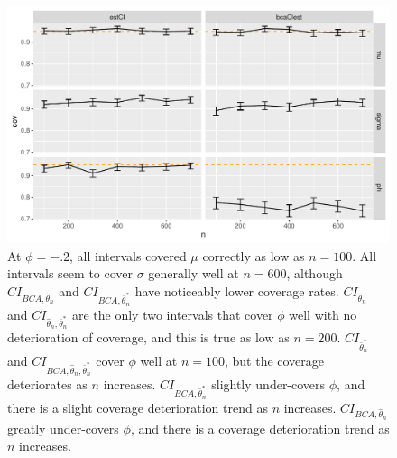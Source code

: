 \documentclass[12pt, letterpaper, titlepage]{article}
\begin{document}
\begin{figure}[tbp]
\caption{}
  \centering
  \includegraphics[width=\textwidth]{figures/plot_n.2}
  \caption{At $\phi = -.2$, all intervals covered $\mu$ correctly as low as $n = 100$. All intervals seem to cover $\sigma$ generally well at $n = 600$, although $CI_{BCA, \hat{\theta}_{n}}$ and $CI_{BCA, \bar\theta_n^*}$ have noticeably lower coverage rates. $CI_{\hat{\theta}_{n}}$ and $CI_{\hat{\theta}_{n}, \bar\theta_n^*}$ are the only two intervals that cover $\phi$ well with no deterioration of coverage, and this is true as low as $n = 200$.  $CI_{\bar\theta_n^*}$ and $CI_{BCA, \hat{\theta}_{n}, \bar\theta_n^*}$ cover $\phi$ well at $n = 100$, but the coverage deteriorates as $n$ increases. $CI_{BCA, \bar\theta_n^*}$ slightly under-covers $\phi$, and there is a slight coverage deterioration trend as $n$ increases. $CI_{BCA, \hat{\theta}_{n}}$ greatly under-covers $\phi$, and there is a coverage deterioration trend as $n$ increases.}
  \label{fig:plot_n.2}
\end{figure}
\end{document}

